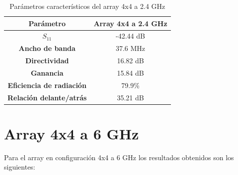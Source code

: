 \begin{table}[H]
  
   
   \small %
   \centering %
   \begin{tabular}{c c} %
   \toprule[\heavyrulewidth]\toprule[\heavyrulewidth]
   \textbf{Parámetro} & \textbf{Array 4x4 a 2.4 GHz} \\ 
   \midrule
   \textbf{$S_{11}$} & -42.44 dB \\
   \textbf{Ancho de banda} & 37.6 MHz \\
   \textbf{Directividad} & 16.82 dB \\
   \textbf{Ganancia} & 15.84 dB \\
   \textbf{Eficiencia de radiación} & 79.9\% \\
   \textbf{Relación delante/atrás} & 35.21 dB \\

   \bottomrule[\heavyrulewidth] 
   \end{tabular}
   
   \caption{Parámetros característicos del array 4x4 a 2.4 GHz} 
   \label{tab:res4x41}
\end{table}






































\section{Array 4x4 a 6 GHz}
\par Para el array en configuración 4x4 a 6 GHz los resultados obtenidos son los siguientes:

